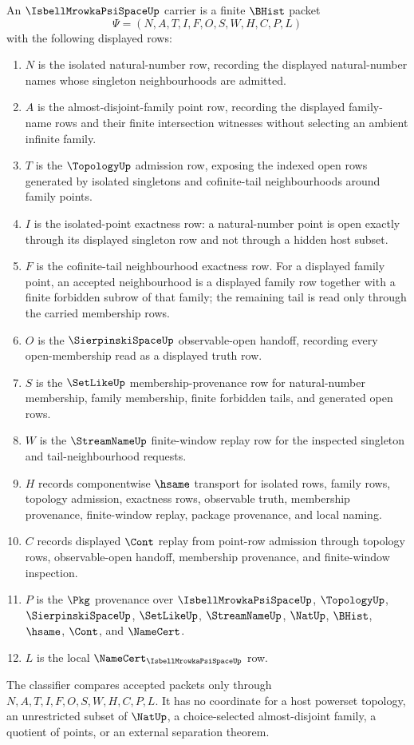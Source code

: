 \begin{definition}
\label{def:isbell-mrowka-psi-space-carrier}
An $\IsbellMrowkaPsiSpaceUp$ carrier is a finite $\BHist$ packet
$$
\Psi=(N,A,T,I,F,O,S,W,H,C,P,L)
$$
with the following displayed rows:
\begin{enumerate}
\item $N$ is the isolated natural-number row, recording the displayed natural-number names whose singleton neighbourhoods are admitted.
\item $A$ is the almost-disjoint-family point row, recording the displayed family-name rows and their finite intersection witnesses without selecting an ambient infinite family.
\item $T$ is the $\TopologyUp$ admission row, exposing the indexed open rows generated by isolated singletons and cofinite-tail neighbourhoods around family points.
\item $I$ is the isolated-point exactness row: a natural-number point is open exactly through its displayed singleton row and not through a hidden host subset.
\item $F$ is the cofinite-tail neighbourhood exactness row. For a displayed family point, an accepted neighbourhood is a displayed family row together with a finite forbidden subrow of that family; the remaining tail is read only through the carried membership rows.
\item $O$ is the $\SierpinskiSpaceUp$ observable-open handoff, recording every open-membership read as a displayed truth row.
\item $S$ is the $\SetLikeUp$ membership-provenance row for natural-number membership, family membership, finite forbidden tails, and generated open rows.
\item $W$ is the $\StreamNameUp$ finite-window replay row for the inspected singleton and tail-neighbourhood requests.
\item $H$ records componentwise $\hsame$ transport for isolated rows, family rows, topology admission, exactness rows, observable truth, membership provenance, finite-window replay, package provenance, and local naming.
\item $C$ records displayed $\Cont$ replay from point-row admission through topology rows, observable-open handoff, membership provenance, and finite-window inspection.
\item $P$ is the $\Pkg$ provenance over $\IsbellMrowkaPsiSpaceUp$, $\TopologyUp$, $\SierpinskiSpaceUp$, $\SetLikeUp$, $\StreamNameUp$, $\NatUp$, $\BHist$, $\hsame$, $\Cont$, and $\NameCert$.
\item $L$ is the local $\NameCert_{\IsbellMrowkaPsiSpaceUp}$ row.
\end{enumerate}
The classifier compares accepted packets only through $N,A,T,I,F,O,S,W,H,C,P,L$. It has no coordinate for a host powerset topology, an unrestricted subset of $\NatUp$, a choice-selected almost-disjoint family, a quotient of points, or an external separation theorem.
\end{definition}

